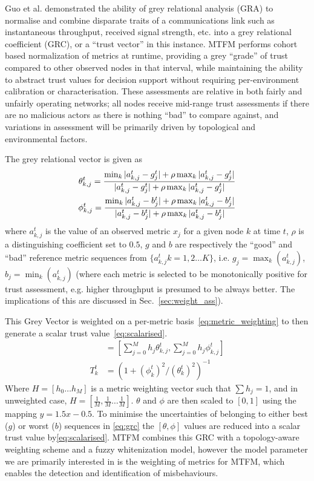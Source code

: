 \documentclass[conference]{IEEEtran}
\begin{document}
Guo et al. \cite{Guo11} demonstrated the ability of grey relational analysis (GRA) \cite{Zuo1995} to normalise and combine disparate traits of a communications link such as instantaneous throughput, received signal strength, etc. into a grey relational coefficient (GRC), or a ``trust vector'' in this instance.
MTFM performs cohort based normalization of metrics at runtime, providing a grey ``grade'' of trust compared to other observed nodes in that interval, while maintaining the ability to abstract trust values for decision support without requiring per-environment calibration or characterisation.
These assessments are relative in both fairly and unfairly operating networks; all nodes receive mid-range trust assessments if there are no malicious actors as there is nothing ``bad'' to compare against, and variations in assessment will be primarily driven by topological and environmental factors.

The grey relational vector is given as
%
\begin{align}
  \label{eq:grc}
  \theta_{k,j}^t = \frac{\min_k|a_{k,j}^t - g_j^t| + \rho \max_k|a_{k,j}^t-g_j^t|}{|a_{k,j}^t-g_j^t| + \rho \max_k|a_{k,j}^t-g_j^t|} \\
  \phi_{k,j}^t = \frac{\min_k|a_{k,j}^t - b_j^t| + \rho \max_k|a_{k,j}^t-b_j^t|}{|a_{k,j}^t-b_j^t| + \rho \max_k|a_{k,j}^t-b_j^t|} \notag 
\end{align}
%
where $a_{k,j}^t$ is the value of an observed metric $x_j$ for a given node $k$ at time $t$, $\rho$ is a distinguishing coefficient set to $0.5$, $g$ and $b$ are respectively the ``good'' and ``bad'' reference metric sequences from $\{a_{k,j}^t k=1,2\dots K\}$, i.e. $g_j=\max_k({a_{k,j}^t})$,  $b_j=\min_k({a_{k,j}^t})$ (where each metric is selected to be monotonically positive for trust assessment, e.g. higher throughput is presumed to be always better. The implications of this are discussed in Sec.~\ref{sec:weight_ass}). 

This Grey Vector is weighted on a per-metric basis~\eqref{eq:metric_weighting} to then generate a scalar trust value~\eqref{eq:scalarised}. 
%
\begin{align}
  [\theta_k^t, \phi_k^t] &= \left[\sum_{j=0}^M h_j \theta_{k,j}^t,\sum_{j=0}^M h_j \phi_{k,j}^t \right] \label{eq:metric_weighting}\\
  T_k^t &= ({1+{(\phi_k^t)^2}/{(\theta_k^t)^2}})^{-1} \label{eq:scalarised}
\end{align}
%
Where $H=[h_0\dots h_M]$ is a metric weighting vector such that $\sum h_j = 1$, and in unweighted case, $H=[\frac{1}{M},\frac{1}{M}\dots\frac{1}{M}]$.
$\theta$ and $\phi$ are then scaled to $[0,1]$ using the mapping $y = 1.5 x - 0.5$.
To minimise the uncertainties of belonging to either best ($g$) or worst ($b$) sequences in \eqref{eq:grc} the $[\theta,\phi]$ values are reduced into a scalar trust value by\eqref{eq:scalarised}\cite{Hong2010}.
MTFM combines this GRC with a topology-aware weighting scheme and a fuzzy whitenization model, however the model parameter we are primarily interested in is the weighting of metrics for MTFM, which enables the detection and identification of misbehaviours.
\end{document}

